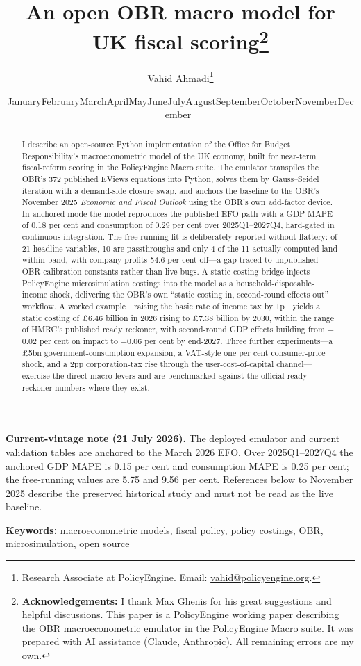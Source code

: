 \documentclass[11pt]{article}
\title{\bfseries An open OBR macro model for UK fiscal scoring\thanks{\textbf{Acknowledgements:} I thank Max Ghenis for his great suggestions and helpful discussions. This paper is a PolicyEngine working paper describing the OBR macroeconometric emulator in the PolicyEngine Macro suite. It was prepared with AI assistance (Claude, Anthropic). All remaining errors are my own.}\\[0.7cm]}
\author{Vahid Ahmadi\thanks{Research Associate at PolicyEngine. Email: \href{mailto:vahid@policyengine.org}{vahid@policyengine.org}.}}
\date{\small \ifcase\month\or January\or February\or March\or April\or May\or June\or July\or August\or September\or October\or November\or December\fi\ \the\year}
\begin{document}
\maketitle

\begin{abstract}
\noindent I describe an open-source Python implementation of the Office for Budget Responsibility's macroeconometric model of the UK economy, built for near-term fiscal-reform scoring in the PolicyEngine Macro suite. The emulator transpiles the OBR's 372 published EViews equations into Python, solves them by Gauss--Seidel iteration with a demand-side closure swap, and anchors the baseline to the OBR's November 2025 \emph{Economic and Fiscal Outlook} using the OBR's own add-factor device. In anchored mode the model reproduces the published EFO path with a GDP MAPE of 0.18 per cent and consumption of 0.29 per cent over 2025Q1--2027Q4, hard-gated in continuous integration. The free-running fit is deliberately reported without flattery: of 21 headline variables, 10 are passthroughs and only 4 of the 11 actually computed land within band, with company profits 54.6 per cent off---a gap traced to unpublished OBR calibration constants rather than live bugs. A static-costing bridge injects PolicyEngine microsimulation costings into the model as a household-disposable-income shock, delivering the OBR's own ``static costing in, second-round effects out'' workflow. A worked example---raising the basic rate of income tax by 1p---yields a static costing of \pounds 6.46 billion in 2026 rising to \pounds 7.38 billion by 2030, within the range of HMRC's published ready reckoner, with second-round GDP effects building from $-$0.02 per cent on impact to $-$0.06 per cent by end-2027. Three further experiments---a \pounds 5bn government-consumption expansion, a VAT-style one per cent consumer-price shock, and a 2pp corporation-tax rise through the user-cost-of-capital channel---exercise the direct macro levers and are benchmarked against the official ready-reckoner numbers where they exist.
\end{abstract}

\medskip
\noindent\textbf{Current-vintage note (21 July 2026).} The deployed emulator and current validation tables are anchored to the March 2026 EFO. Over 2025Q1--2027Q4 the anchored GDP MAPE is 0.15 per cent and consumption MAPE is 0.25 per cent; the free-running values are 5.75 and 9.56 per cent. References below to November 2025 describe the preserved historical study and must not be read as the live baseline.

\medskip
\noindent\textbf{Keywords:} macroeconometric models, fiscal policy, policy costings, OBR, microsimulation, open source

\newpage













\appendix

\end{document}
